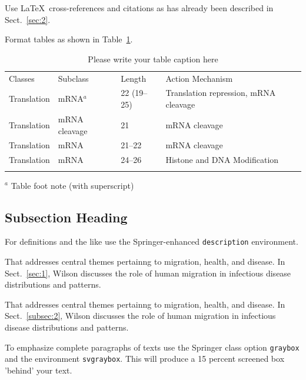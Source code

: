 \documentclass[graybox]{svmult}
\begin{document}
 Use  \LaTeX\ cross-references and citations as has already been described in Sect.~\ref{sec:2}.

 Format tables as shown in Table~\ref{tab:1}.

%
%
\begin{table}
\caption{Please write your table caption here}
\label{tab:1}       %
%
%
\begin{tabular}{p{2cm}p{2.4cm}p{2cm}p{4.9cm}}
\hline\noalign{\smallskip}
Classes & Subclass & Length & Action Mechanism  \\
\noalign{\smallskip}\svhline\noalign{\smallskip}
Translation & mRNA$^a$  & 22 (19--25) & Translation repression, mRNA cleavage\\
Translation & mRNA cleavage & 21 & mRNA cleavage\\
Translation & mRNA  & 21--22 & mRNA cleavage\\
Translation & mRNA  & 24--26 & Histone and DNA Modification\\
\noalign{\smallskip}\hline\noalign{\smallskip}
\end{tabular}
$^a$ Table foot note (with superscript)
\end{table}
%

\subsection{Subsection Heading}
\label{sec:3}

For definitions and the like use the Springer-enhanced \verb|description| environment.

\begin{description}[Type 1]
\item[Type 1]{That addresses central themes pertainng to migration, health, and disease. In Sect.~\ref{sec:1}, Wilson discusses the role of human migration in infectious disease distributions and patterns.}
\item[Type 2]{That addresses central themes pertainng to migration, health, and disease. In Sect.~\ref{subsec:2}, Wilson discusses the role of human migration in infectious disease distributions and patterns.}
\end{description}

\begin{svgraybox}
To emphasize complete paragraphs of texts use the Springer class option \verb|graybox| and the environment \verb|svgraybox|. This will produce a 15 percent screened box 'behind' your text.
\end{svgraybox}
\end{document}
